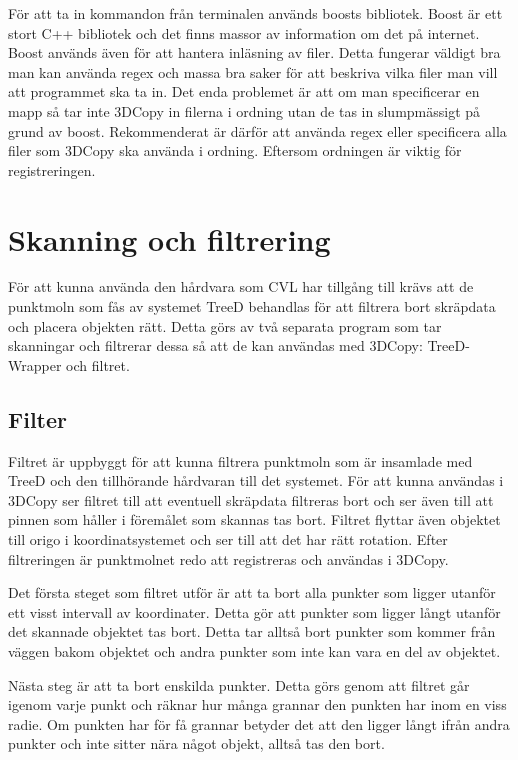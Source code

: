 \documentclass[a4paper,titlepage,12pt]{article}
\begin{document}
För att ta in kommandon från terminalen används boosts bibliotek. Boost är ett stort C++ bibliotek och det finns massor av information om det på internet. Boost används även för att hantera inläsning av filer. Detta fungerar väldigt bra man kan använda regex och massa bra saker för att beskriva vilka filer man vill att programmet ska ta in. Det enda problemet är att om man specificerar en mapp så tar inte 3DCopy in filerna i ordning utan de tas in slumpmässigt på grund av boost. Rekommenderat är därför att använda regex eller specificera alla filer som 3DCopy ska använda i ordning. Eftersom ordningen är viktig för registreringen.


\section{Skanning och filtrering}
	För att kunna använda den hårdvara som CVL har tillgång till krävs att de punktmoln som fås av systemet TreeD behandlas för att filtrera bort skräpdata och placera objekten rätt. Detta görs av två separata program som tar skanningar och filtrerar dessa så att de kan användas med 3DCopy: TreeD-Wrapper och filtret.
	
	\subsection{Filter}
		Filtret är uppbyggt för att kunna filtrera punktmoln som är insamlade med TreeD och den tillhörande hårdvaran till det systemet. För att kunna användas i 3DCopy ser filtret till att eventuell skräpdata filtreras bort och ser även till att pinnen som håller i föremålet som skannas tas bort. Filtret flyttar även objektet till origo i koordinatsystemet och ser till att det har rätt rotation. Efter filtreringen är punktmolnet redo att registreras och användas i 3DCopy.
		
		Det första steget som filtret utför är att ta bort alla punkter som ligger utanför ett visst intervall av koordinater. Detta gör att punkter som ligger långt utanför det skannade objektet tas bort. Detta tar alltså bort punkter som kommer från väggen bakom objektet och andra punkter som inte kan vara en del av objektet.
		
		Nästa steg är att ta bort enskilda punkter. Detta görs genom att filtret går igenom varje punkt och räknar hur många grannar den punkten har inom en viss radie. Om punkten har för få grannar betyder det att den ligger långt ifrån andra punkter och inte sitter nära något objekt, alltså tas den bort.
		
\end{document}
